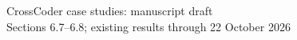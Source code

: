 \documentclass[11pt]{article}
\begin{document}
\begin{center}
{\Large CrossCoder case studies: manuscript draft}\\[4pt]
{\small Sections 6.7--6.8; existing results through 22 October 2026}
\end{center}
\setcounter{section}{6}
\setcounter{subsection}{6}

\clearpage


\end{document}
